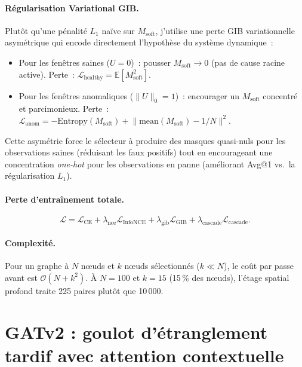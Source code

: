 \documentclass[a4paper,11pt,oneside]{report}
\begin{document}
\paragraph{R\'egularisation Variational GIB.} Plut\^ot qu'une p\'enalit\'e $L_1$ na\"ive sur $M_{\mathrm{soft}}$, j'utilise une perte GIB variationnelle asym\'etrique qui encode directement l'hypoth\`ese du syst\`eme dynamique~:
\begin{itemize}
  \item Pour les fen\^etres saines ($U{=}0$)~: pousser $M_{\mathrm{soft}} \to 0$ (pas de cause racine active). Perte~: $\mathcal{L}_{\mathrm{healthy}} = \mathbb{E}[M_{\mathrm{soft}}^2]$.
  \item Pour les fen\^etres anomaliques ($\lVert U \rVert_0 {=} 1$)~: encourager un $M_{\mathrm{soft}}$ concentr\'e et parcimonieux. Perte~: $\mathcal{L}_{\mathrm{anom}} = -\mathrm{Entropy}(M_{\mathrm{soft}}) + \lVert \mathrm{mean}(M_{\mathrm{soft}}) - 1/N \rVert^2$.
\end{itemize}
Cette asym\'etrie force le s\'electeur \`a produire des masques quasi-nuls pour les observations saines (r\'eduisant les faux positifs) tout en encourageant une concentration \emph{one-hot} pour les observations en panne (am\'eliorant Avg@1 vs.\ la r\'egularisation $L_1$).

\paragraph{Perte d'entra\^inement totale.}
\begin{equation}
  \mathcal{L} = \mathcal{L}_{\mathrm{CE}} + \lambda_{\mathrm{nce}} \mathcal{L}_{\mathrm{InfoNCE}} + \lambda_{\mathrm{gib}} \mathcal{L}_{\mathrm{GIB}} + \lambda_{\mathrm{cascade}} \mathcal{L}_{\mathrm{cascade}}.
  \label{eq:loss}
\end{equation}

\paragraph{Complexit\'e.} Pour un graphe \`a $N$ nœuds et $k$ nœuds s\'electionn\'es ($k \ll N$), le co\^ut par passe avant est $\mathcal{O}(N + k^2)$. \`A $N{=}100$ et $k{=}15$ (15\,\% des nœuds), l'\'etage spatial profond traite 225 paires plut\^ot que 10\,000.

\section{GATv2 : goulot d'\'etranglement tardif avec attention contextuelle}
\label{sec:methode-gatv2}
\end{document}
